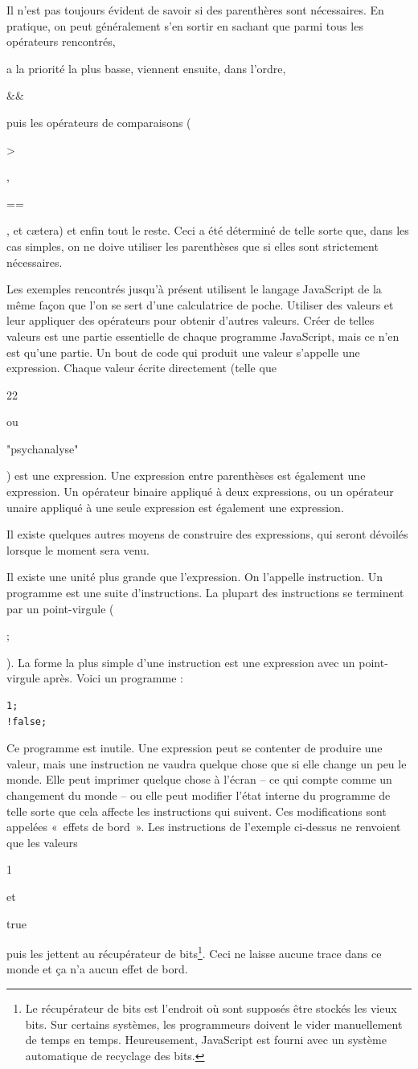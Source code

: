 \documentclass{FramateX}
\renewcommand{\texttt}[1]{\begin{sffamily}{#1}\end{sffamily}}
\begin{document}
\begin{center}\end{center}

Il n'est pas toujours évident de savoir si des parenthères sont
nécessaires. En pratique, on peut généralement s'en sortir en sachant
que parmi tous les opérateurs rencontrés, \texttt{\textbar{}\textbar{}}
a la priorité la plus basse, viennent ensuite, dans l'ordre,
\texttt{\&\&} puis les opérateurs de comparaisons
(\texttt{\textgreater{}}, \texttt{==}, et cætera) et enfin tout le
reste. Ceci a été déterminé de telle sorte que, dans les cas simples, on
ne doive utiliser les parenthèses que si elles sont strictement
nécessaires.

\begin{center}\end{center}

Les exemples rencontrés jusqu'à présent utilisent le langage JavaScript
de la même façon que l'on se sert d'une calculatrice de poche. Utiliser
des valeurs et leur appliquer des opérateurs pour obtenir d'autres
valeurs. Créer de telles valeurs est une partie essentielle de chaque
programme JavaScript, mais ce n'en est qu'une partie. Un bout de code
qui produit une valeur s'appelle une expression. Chaque valeur écrite
directement (telle que \texttt{22} ou \texttt{"psychanalyse"}) est une
expression. Une expression entre parenthèses est également une
expression. Un opérateur binaire appliqué à deux expressions, ou un
opérateur unaire appliqué à une seule expression est également une
expression.

Il existe quelques autres moyens de construire des expressions, qui
seront dévoilés lorsque le moment sera venu.

Il existe une unité plus grande que l'expression. On l'appelle
instruction. Un programme est une suite d'instructions. La plupart des
instructions se terminent par un point-virgule (\texttt{;}). La forme la
plus simple d'une instruction est une expression avec un point-virgule
après. Voici un programme :

\begin{lstlisting}
1;
!false;
\end{lstlisting}
Ce programme est inutile. Une expression peut se contenter de produire
une valeur, mais une instruction ne vaudra quelque chose que si elle
change un peu le monde. Elle peut imprimer quelque chose à l'écran -- ce
qui compte comme un changement du monde -- ou elle peut modifier l'état
interne du programme de telle sorte que cela affecte les instructions
qui suivent. Ces modifications sont appelées «~effets de bord~». Les
instructions de l'exemple ci-dessus ne renvoient que les valeurs
\texttt{1} et \texttt{true} puis les jettent au récupérateur de
bits\footnote{Le récupérateur de bits est l'endroit où sont supposés être stockés les vieux bits. Sur certains systèmes, les programmeurs doivent le vider manuellement de temps en temps. Heureusement, JavaScript est fourni avec un système automatique de recyclage des bits.}. Ceci ne laisse aucune trace dans ce monde et
ça n'a aucun effet de bord.
\end{document}
